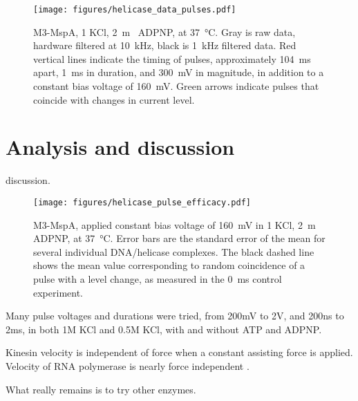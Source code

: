 \begin{figure}[h]
\begin{centering}
\texttt{[image: figures/helicase\_data\_pulses.pdf]}
\caption[A fraction of pulses move the helicase]{M3-MspA, \SI{1}{\Molar} KCl, \SI{2}{\m\Molar} ADPNP, at \SI{37}{\celsius}.  Gray is raw data, hardware filtered at \SI{10}{\kHz}, black is \SI{1}{\kHz} filtered data.  Red vertical lines indicate the timing of pulses, approximately \SI{104}{\ms} apart, \SI{1}{\ms} in duration, and \SI{300}{\mV} in magnitude, in addition to a constant bias voltage of \SI{160}{\mV}.  Green arrows indicate pulses that coincide with changes in current level.}
\label{fig:helicase_pulse_traces}
\end{centering}
\end{figure}

\section{Analysis and discussion}

discussion.

\begin{figure}[h]
\begin{centering}
\texttt{[image: figures/helicase\_pulse\_efficacy.pdf]}
\caption[Quantifying efficacy of pulses]{M3-MspA, applied constant bias voltage of \SI{160}{\mV} in \SI{1}{\Molar} KCl, \SI{2}{\m\Molar} ADPNP, at \SI{37}{\celsius}.  Error bars are the standard error of the mean for several individual DNA/helicase complexes.  The black dashed line shows the mean value corresponding to random coincidence of a pulse with a level change, as measured in the \SI{0}{\ms} control experiment.}
\label{fig:helicase_pulse_efficacy}
\end{centering}
\end{figure}

Many pulse voltages and durations were tried, from 200mV to 2V, and 200ns to 2ms, in both 1M KCl and 0.5M KCl, with and without ATP and ADPNP.

Kinesin velocity is independent of force when a constant assisting force is applied.  Velocity of RNA polymerase is nearly force independent \citep{Bustamante2004}.

What really remains is to try other enzymes.

